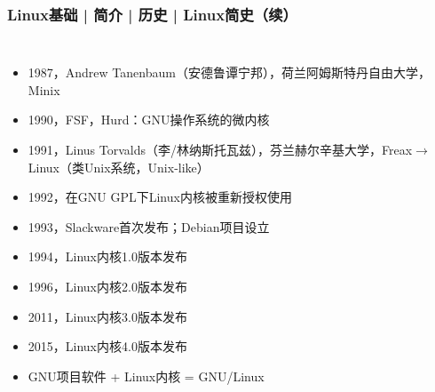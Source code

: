 \begin{frame}
  \frametitle{Linux基础 | 简介 | 历史 | Linux简史（续）}
  \begin{columns}
  \begin{itemize}[<+->]
    \item 1987，Andrew Tanenbaum（安德鲁\textbullet 谭宁邦），荷兰阿姆斯特丹自由大学，Minix
    \item 1990，FSF，Hurd：GNU操作系统的微内核
    \item 1991，\alert{Linus Torvalds}（李/林纳斯\textbullet 托瓦兹），芬兰赫尔辛基大学，Freax$\rightarrow$ \alert{Linux}（类Unix系统，Unix-like）
    \item 1992，在GNU GPL下Linux内核被重新授权使用
    \item 1993，Slackware首次发布；Debian项目设立
    \item 1994，Linux内核1.0版本发布
    \item 1996，Linux内核2.0版本发布
    \item 2011，Linux内核3.0版本发布
    \item 2015，Linux内核4.0版本发布
    \item GNU项目软件 + Linux内核 = \alert{GNU/Linux}
  \end{itemize}
  \end{columns}
\end{frame}

